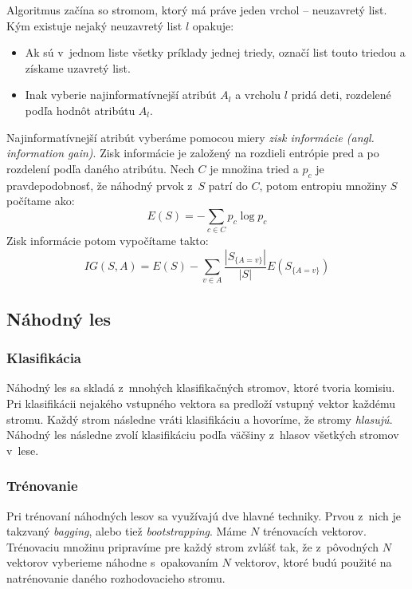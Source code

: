 Algoritmus začína so stromom, ktorý má práve jeden vrchol -- neuzavretý list. Kým existuje nejaký neuzavretý list $l$ opakuje:
\begin{itemize}
    \item Ak sú v~jednom liste všetky príklady jednej triedy, označí list touto triedou a získame uzavretý list.
    \item Inak vyberie najinformatívnejší atribút $A_l$ a vrcholu $l$ pridá deti, rozdelené podľa hodnôt atribútu $A_l$.
\end{itemize}

Najinformatívnejší atribút vyberáme pomocou miery \textit{zisk informácie (angl. information gain)}. Zisk informácie je založený na rozdieli entrópie pred a po rozdelení podľa daného atribútu. Nech $C$ je množina tried a $p_c$ je pravdepodobnosť, že náhodný prvok z~$S$ patrí do $C$, potom entropiu množiny $S$ počítame ako:
$$E(S) = -\sum_{c \in C} p_c\log{p_c}$$
Zisk informácie potom vypočítame takto:
$$IG(S,A) = E(S) - \sum_{v \in A} \frac{\left| S_{\{A=v\}} \right|}{\left| S \right|} E\left(S_{\{A=v\}}\right)$$

\subsection{Náhodný les}

\subsubsection{Klasifikácia}
Náhodný les sa skladá z~mnohých klasifikačných stromov, ktoré tvoria komisiu. Pri klasifikácii nejakého vstupného vektora sa predloží vstupný vektor každému stromu. Každý strom následne vráti klasifikáciu a hovoríme, že stromy \textit{hlasujú}. Náhodný les následne zvolí klasifikáciu podľa väčšiny z~hlasov všetkých stromov v~lese.


\subsubsection{Trénovanie}

Pri trénovaní náhodných lesov sa využívajú dve hlavné techniky. Prvou z~nich je takzvaný \textit{bagging}, alebo tiež \textit{bootstrapping}. Máme $N$ trénovacích vektorov. Trénovaciu množinu pripravíme pre každý strom zvlášť tak, že z~pôvodných $N$ vektorov vyberieme náhodne s~opakovaním $N$ vektorov, ktoré budú použité na natrénovanie daného rozhodovacieho stromu.


